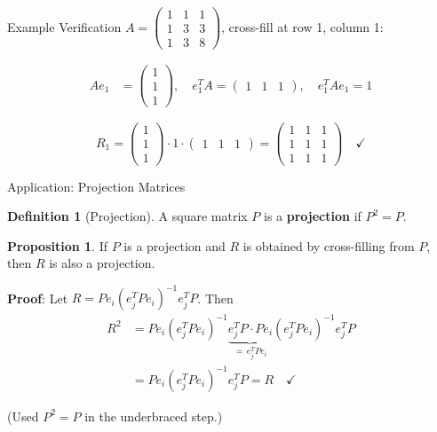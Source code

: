 \documentclass[10pt]{beamer}
\theoremstyle{definition}
\newtheorem{defi}{Definition}[section]
\newtheorem{prop}{Proposition}[section]
\newcommand{\x}[1]{\alert{\textbf{#1}}}
\begin{document}
\begin{frame}{Example Verification}
$A = \begin{pmatrix} 1 & 1 & 1 \\ 1 & 3 & 3 \\ 1 & 3 & 8 \end{pmatrix}$, \quad cross-fill at row 1, column 1:

\vfill
\begin{align*}
Ae_1 &= \begin{pmatrix} 1 \\ 1 \\ 1 \end{pmatrix}, \quad
e_1^T A = \begin{pmatrix} 1 & 1 & 1 \end{pmatrix}, \quad
e_1^T A e_1 = 1
\end{align*}

$$R_1 = \begin{pmatrix} 1 \\ 1 \\ 1 \end{pmatrix} \cdot 1 \cdot \begin{pmatrix} 1 & 1 & 1 \end{pmatrix}
= \begin{pmatrix}
1 & 1 & 1 \\
1 & 1 & 1 \\
1 & 1 & 1
\end{pmatrix} \quad \checkmark$$
\end{frame}

\begin{frame}{Application: Projection Matrices}
\begin{defi}[Projection]
A square matrix $P$ is a \x{projection} if $P^2 = P$.
\end{defi}

\vfill
\begin{prop}
If $P$ is a projection and $R$ is obtained by cross-filling from $P$, then $R$ is also a projection.
\end{prop}

\vfill
\textbf{Proof}: Let $R = Pe_i(e_j^TPe_i)^{-1}e_j^TP$. Then
\begin{align*}
R^2 &= Pe_i(e_j^TPe_i)^{-1} \underbrace{e_j^T P \cdot P e_i}_{= \, e_j^TPe_i} (e_j^TPe_i)^{-1}e_j^TP \\
&= Pe_i(e_j^TPe_i)^{-1}e_j^TP = R \quad \checkmark
\end{align*}

(Used $P^2 = P$ in the underbraced step.)
\end{frame}
\end{document}
